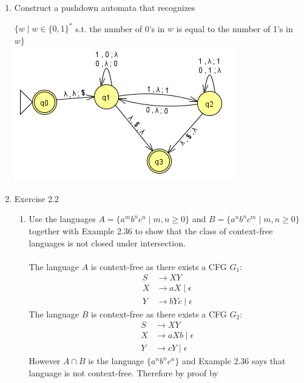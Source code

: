 \documentclass{article}
\begin{document}
\begin{enumerate}
        \item Construct a pushdown automata that recognizes 
            \begin{center}
                $\{w\mid w \in \{0,1\}^* $ s.t. the number of 0's in $ w $ is equal to the number of 1's in $ w \}$\\
                \includegraphics[scale=0.6]{machine1}                
            \end{center}
        \item Exercise 2.2
            \begin{enumerate}[label =\alph*.]
                \item Use the languages $A=\{a^mb^nc^n \mid m,n\geq 0\}$ and $B=\{a^nb^nc^m\mid m,n \geq 0\}$ together with Example 2.36 to show that 
                the class of context-free languages is not closed under intersection.\\\\
                The language $A$ is context-free as there exists a CFG $G_1$:
                    \begin{align*}
                        S &\rightarrow XY\\
                        X &\rightarrow aX\mid \epsilon\\
                        Y &\rightarrow bYc\mid \epsilon
                    \end{align*}
                The language $B$ is context-free as there exists a CFG $G_2$:
                    \begin{align*}
                        S &\rightarrow XY\\
                        X &\rightarrow aXb\mid \epsilon\\
                        Y &\rightarrow cY\mid \epsilon
                    \end{align*}
                However $A\cap B$ is the language $\{a^nb^nc^n\}$ and Example 2.36 says that language is not context-free. Therefore by proof by 

\end{enumerate}
\end{enumerate}
\end{document}
